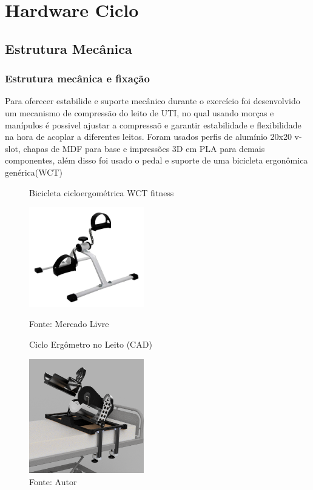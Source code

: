 \documentclass[../poliXuniversity_hospital_(USP)_report.tex]{subfiles}
\begin{document}
\chapter{Hardware Ciclo}

\section{Estrutura Mecânica}

\subsection{Estrutura mecânica e fixação}

Para oferecer estabilide e suporte mecânico durante o exercício foi desenvolvido um mecanismo de compressão do leito de UTI, no qual usando morças e manípulos é possivel ajustar a compressaõ e garantir estabilidade e flexibilidade na hora de acoplar a diferentes leitos. Foram usados perfis de alumínio 20x20 v-slot, chapas de MDF para base e impressões 3D em PLA para demais componentes, além disso foi usado o pedal e suporte de uma bicicleta ergonômica genérica(WCT)

\begin{figure}[h]
\centering
    \begin{minipage}{0.5\textwidth}
        \centering
        \caption{Bicicleta cicloergométrica WCT fitness}
        \centering %
        \includegraphics[width=5cm]{images/WCT_ciclo.jpg}
        \caption*{Fonte: Mercado Livre}
        \label{figura: icicleta cicloergométrica WCT fitness}
        
    \end{minipage}\hfill
    \begin{minipage}{0.5\textwidth}
    
        \centering
        \caption{Ciclo Ergômetro no Leito (CAD)}
        \centering %
        \includegraphics[width=5cm]{images/ciclo_leito.png}
        \caption*{Fonte: Autor}
        \label{figura: Ciclo Ergômetro no Leito (CAD)}
        
    \end{minipage}\hfill
\end{figure}
\end{document}

